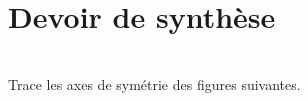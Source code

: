 


\pagestyle{empty}
\section*{Devoir de synthèse}

\\
Trace les axes de symétrie des figures suivantes.\\
[Contenu exercices...]
